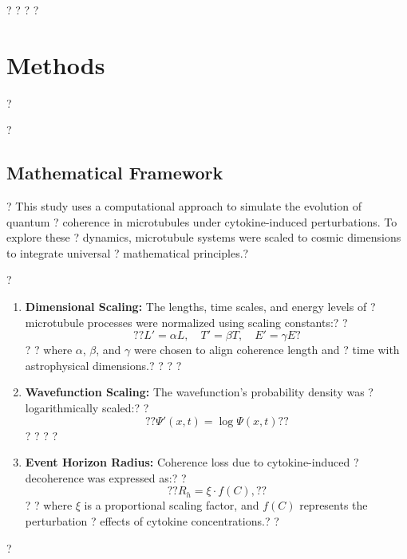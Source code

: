 ?%
?%
?%
?\section{Methods}?

?\subsection{Mathematical Framework}?
This study uses a computational approach to simulate the evolution of quantum ?
coherence in microtubules under cytokine-induced perturbations. To explore these ?
dynamics, microtubule systems were scaled to cosmic dimensions to integrate universal ?
mathematical principles.?

?\begin{enumerate}?
?    \item \textbf{Dimensional Scaling:} The lengths, time scales, and energy levels of ?
microtubule processes were normalized using scaling constants:?
?    \begin{equation}?
?    L' = \alpha L, \quad T' = \beta T, \quad E' = \gamma E
?    \end{equation}?
?    where $\alpha$, $\beta$, and $\gamma$ were chosen to align coherence length and ?
time with astrophysical dimensions.?
?    ?
?    \item \textbf{Wavefunction Scaling:} The wavefunction's probability density was ?
logarithmically scaled:?
?    \begin{equation}?
?    \Psi' (x,t) = \log{\Psi(x,t)}?
?    \end{equation}?
?    ?
?    \item \textbf{Event Horizon Radius:} Coherence loss due to cytokine-induced ?
decoherence was expressed as:?
?    \begin{equation}?
?    R_h = \xi \cdot f(C),?
?    \end{equation}?
?    where $\xi$ is a proportional scaling factor, and $f(C)$ represents the perturbation ?
effects of cytokine concentrations.?
?\end{enumerate}?

